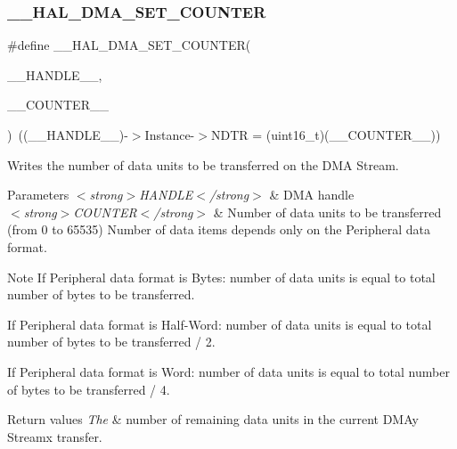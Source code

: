 \subsubsection{\texorpdfstring{\+\_\+\+\_\+\+H\+A\+L\+\_\+\+D\+M\+A\+\_\+\+S\+E\+T\+\_\+\+C\+O\+U\+N\+T\+ER}{\_\_HAL\_DMA\_SET\_COUNTER}}
{\footnotesize\ttfamily \#define \+\_\+\+\_\+\+H\+A\+L\+\_\+\+D\+M\+A\+\_\+\+S\+E\+T\+\_\+\+C\+O\+U\+N\+T\+ER(\begin{DoxyParamCaption}\item[{}]{\+\_\+\+\_\+\+H\+A\+N\+D\+L\+E\+\_\+\+\_\+,  }\item[{}]{\+\_\+\+\_\+\+C\+O\+U\+N\+T\+E\+R\+\_\+\+\_\+ }\end{DoxyParamCaption})~((\+\_\+\+\_\+\+H\+A\+N\+D\+L\+E\+\_\+\+\_\+)-\/$>$Instance-\/$>$N\+D\+TR = (uint16\+\_\+t)(\+\_\+\+\_\+\+C\+O\+U\+N\+T\+E\+R\+\_\+\+\_\+))}



Writes the number of data units to be transferred on the D\+MA Stream. 


\begin{DoxyParams}{Parameters}
{\em $<$strong$>$\+H\+A\+N\+D\+L\+E$<$/strong$>$} & D\+MA handle \\
\hline
{\em $<$strong$>$\+C\+O\+U\+N\+T\+E\+R$<$/strong$>$} & Number of data units to be transferred (from 0 to 65535) Number of data items depends only on the Peripheral data format.\\
\hline
\end{DoxyParams}
\begin{DoxyNote}{Note}
If Peripheral data format is Bytes\+: number of data units is equal to total number of bytes to be transferred.

If Peripheral data format is Half-\/\+Word\+: number of data units is equal to total number of bytes to be transferred / 2.

If Peripheral data format is Word\+: number of data units is equal to total number of bytes to be transferred / 4.
\end{DoxyNote}

\begin{DoxyRetVals}{Return values}
{\em The} & number of remaining data units in the current D\+M\+Ay Streamx transfer. \\
\hline
\end{DoxyRetVals}
